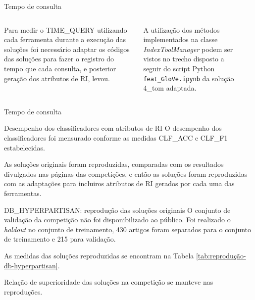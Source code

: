 \documentclass[%
  10pt,%
  aspectratio = 169,%
  compress,%
  t,%
]{beamer}%
\begin{document}
    \begin{frame}{}{Tempo de consulta}
        \begin{columns}
            Para medir o TIME\_QUERY utilizando cada ferramenta durante a execução das soluções foi necessário adaptar os códigos das soluções para fazer o registro do tempo que cada consulta, e posterior geração dos atributos de RI, levou.

			A utilização dos métodos implementados na classe \textit{IndexToolManager} podem ser vistos no trecho disposto a seguir do script Python \texttt{feat\_GloVe.ipynb} da solução 4\_tom adaptada.

                \vspace{-1.0cm}
                \inputminted[bgcolor=bg, fontsize=\scriptsize,
                baselinestretch=1, tabsize=1,obeytabs,showtabs, breaklines]{python}{codes/time-query-calculation-4-tom.py}
        \end{columns}
    \end{frame}

    \begin{frame}{}{Tempo de consulta}
        \vspace{-0.5cm}
        
    \end{frame}

    \begin{frame}{}{Desempenho dos classificadores com atributos de RI}
        O desempenho dos classificadores foi mensurado conforme as medidas CLF\_ACC e CLF\_F1 estabelecidas.

        As soluções originais foram reproduzidas, comparadas com os resultados divulgados nas páginas das competições, e então as soluções foram reproduzidas com as adaptações para incluiros atributos de RI gerados por cada uma das ferramentas.
    \end{frame}

    \begin{frame}{}{DB\_HYPERPARTISAN: reprodução das soluções originais}
        O conjunto de validação da competição não foi disponibilizado ao público.
        Foi realizado o \textit{holdout} no conjunto de treinamento, 430 artigos foram separados para o conjunto de treinamento e 215 para validação.

        As medidas das soluções reproduzidas se encontram na Tabela \ref{tab:reprodução-db-hyperpartisan}.
        
        

        Relação de superioridade das soluções na competição se manteve nas reproduções.

    \end{frame}
\end{document}
